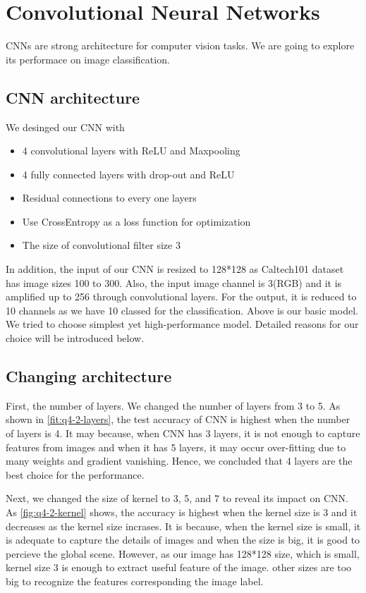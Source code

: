 \section{Convolutional Neural Networks}
\label{sec:intro}

CNNs are strong architecture for computer vision tasks. We are going to explore its performace on image classification.

\subsection{CNN architecture}
We desinged our CNN with
\begin{itemize}
	\item 4 convolutional layers with ReLU and Maxpooling
	\item 4 fully connected layers with drop-out and ReLU
	\item Residual connections to every one layers
	\item Use CrossEntropy as a loss function for optimization
	\item The size of convolutional filter size 3
\end{itemize}
In addition, the input of our CNN is resized to 128*128 as Caltech101 dataset has image sizes 100 to 300.
Also, the input image channel is 3(RGB) and it is amplified up to 256 through convolutional layers. For the output, it is reduced to 10 channels as we have 10 classed for the classification.
Above is our basic model. We tried to choose simplest yet high-performance model. Detailed reasons for our choice will be introduced below.

\subsection{Changing architecture}
First, the number of layers. We changed the number of layers from 3 to 5. As shown in \cref{fit:q4-2-layers}, the test accuracy of CNN is highest when the number of layers is 4. It may because, when CNN has 3 layers, it is not enough to capture features from images and when it has 5 layers, it may occur over-fitting due to many weights and gradient vanishing. Hence, we concluded that 4 layers are the best choice for the performance.

Next, we changed the size of kernel to 3, 5, and 7 to reveal its impact on CNN. As \cref{fig:q4-2-kernel} shows, the accuracy is highest when the kernel size is 3 and it decreases as the kernel size incrases. It is because, when the kernel size is small, it is adequate to capture the details of images and when the size is big, it is good to percieve the global scene. However, as our image has 128*128 size, which is small, kernel size 3 is enough to extract useful feature of the image. other sizes are too big to recognize the features corresponding the image label.

